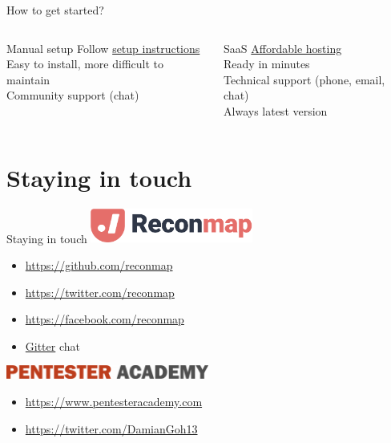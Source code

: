 \documentclass{beamer}
\begin{document}
\begin{frame}{How to get started?}
    \begin{columns}[T]
        \begin{column}{.45\textwidth}
            \begin{block}{Manual setup}
            Follow \href{https://github.com/reconmap/reconmap\#readme}{setup instructions}\\
			\bigskip
            Easy to install, more difficult to maintain\\
            Community support (chat)
            \end{block}
        \end{column}
        \begin{column}{.45\textwidth}
            \begin{block}{SaaS}
            \href{https://reconmap.com}{Affordable hosting}\\
            \bigskip
            Ready in minutes\\
            Technical support (phone, email, chat)\\
            Always latest version            
            \end{block}
        \end{column}
    \end{columns}
    
\end{frame}

\section{Staying in touch}

\begin{frame}{Staying in touch}
	\includegraphics[width=0.4\textwidth]{images/reconmap-logo.png}	
    \begin{itemize}
        \item \href{https://github.com/reconmap}{https://github.com/reconmap}
        \item \href{https://twitter.com/reconmap}{https://twitter.com/reconmap}
        \item \href{https://facebook.com/reconmap}{https://facebook.com/reconmap}
        \item \href{https://gitter.im/reconmap/community}{Gitter} chat
    \end{itemize}
    \bigskip

	\includegraphics[width=0.5\textwidth]{images/pentester-academy-logo.png}	
    \begin{itemize}
        \item \href{https://www.pentesteracademy.com}{https://www.pentesteracademy.com}
        \item \href{https://twitter.com/DamianGoh13}{https://twitter.com/DamianGoh13}
    \end{itemize}
\end{frame}
\end{document}
